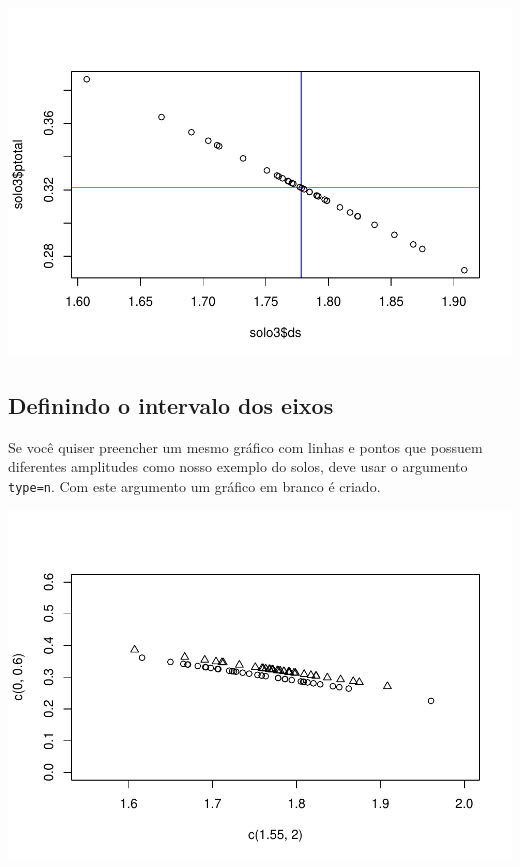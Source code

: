 \documentclass[]{book}
\newenvironment{Shaded}{\begin{snugshade}}{\end{snugshade}}
\newcommand{\DataTypeTok}[1]{\textcolor[rgb]{0.13,0.29,0.53}{#1}}
\newcommand{\DecValTok}[1]{\textcolor[rgb]{0.00,0.00,0.81}{#1}}
\newcommand{\FloatTok}[1]{\textcolor[rgb]{0.00,0.00,0.81}{#1}}
\newcommand{\KeywordTok}[1]{\textcolor[rgb]{0.13,0.29,0.53}{\textbf{#1}}}
\newcommand{\NormalTok}[1]{#1}
\newcommand{\OperatorTok}[1]{\textcolor[rgb]{0.81,0.36,0.00}{\textbf{#1}}}
\newcommand{\StringTok}[1]{\textcolor[rgb]{0.31,0.60,0.02}{#1}}
\begin{document}
\includegraphics{TudodoR_files/figure-latex/unnamed-chunk-164-1.pdf}

\hypertarget{definindo-o-intervalo-dos-eixos}{%
\subsection{Definindo o intervalo dos eixos}\label{definindo-o-intervalo-dos-eixos}}

Se você quiser preencher um mesmo gráfico com linhas e pontos que possuem diferentes amplitudes como nosso exemplo do solos, deve usar o argumento \texttt{type=n}. Com este argumento um gráfico em branco é criado.

\begin{Shaded}
\end{Shaded}

\includegraphics{TudodoR_files/figure-latex/unnamed-chunk-165-1.pdf}
\end{document}
